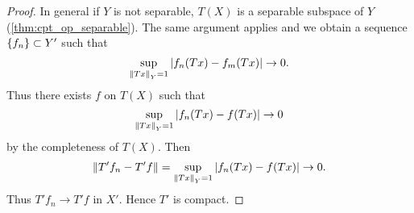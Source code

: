 \begin{proof}
    In general if $Y$ is not separable, $T(X)$ is a separable subspace 
    of $Y$ (\cref{thm:cpt_op_separable}). The same argument applies and 
    we obtain a sequence $\left\{ {f_n} \right\}\subset Y'$ such that 
    \begin{equation*}
        \sup_{\left\lVert {Tx} \right\rVert_Y = 1} \left\lvert {f_n(Tx) - f_m(Tx)} \right\rvert \to 0.
    \end{equation*}
    Thus there exists $f$ on $T(X)$ such that 
    \begin{equation*}
        \sup_{\left\lVert {Tx} \right\rVert_Y = 1} \left\lvert {f_n(Tx) - f(Tx)} \right\rvert \to 0
    \end{equation*}
    by the completeness of $T(X)$. Then 
    \begin{equation*}
        \left\lVert {T'f_n - T'f} \right\rVert = \sup_{\left\lVert {Tx} \right\rVert_Y = 1} \left\lvert {f_n(Tx) - f(Tx)} \right\rvert \to 0.
    \end{equation*}
    Thus $T'f_n\to T'f$ in $X'$. Hence $T'$ is compact.
\end{proof}